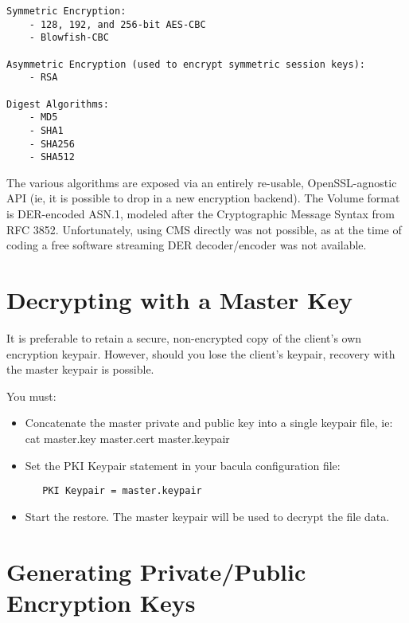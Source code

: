 \begin{verbatim}
Symmetric Encryption:
    - 128, 192, and 256-bit AES-CBC
    - Blowfish-CBC

Asymmetric Encryption (used to encrypt symmetric session keys):
    - RSA

Digest Algorithms:
    - MD5
    - SHA1
    - SHA256
    - SHA512
\end{verbatim}

The various algorithms are exposed via an entirely re-usable,
OpenSSL-agnostic API (ie, it is possible to drop in a new encryption
backend). The Volume format is DER-encoded ASN.1, modeled after the
Cryptographic Message Syntax from RFC 3852. Unfortunately, using CMS
directly was not possible, as at the time of coding a free software
streaming DER decoder/encoder was not available.


\section{Decrypting with a Master Key}

It is preferable to retain a secure, non-encrypted copy of the  
client's own encryption keypair. However, should you lose the  
client's keypair, recovery with the master keypair is possible.

You must:
\begin{itemize}
\item Concatenate the master private and public key into a single  
   keypair file, ie:
   cat master.key master.cert \gt master.keypair

\item Set the PKI Keypair statement in your bacula configuration file:

\begin{verbatim}
   PKI Keypair = master.keypair
\end{verbatim}

\item Start the restore. The master keypair will be used to decrypt
     the file data.
 
\end{itemize}


\section{Generating Private/Public Encryption Keys}

